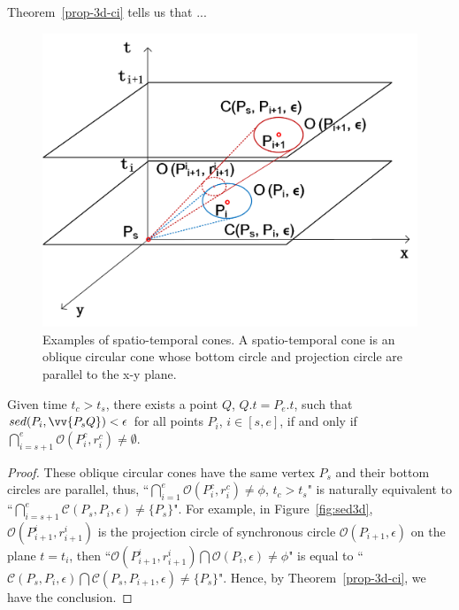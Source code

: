 Theorem~\ref{prop-3d-ci} tells us that ...


\begin{figure}[tb!]
\centering
\includegraphics[scale=0.6]{figures/Fig-cis.png}
\caption{\small Examples of spatio-temporal cones. A spatio-temporal cone is an oblique circular cone whose bottom circle and projection circle are parallel to the x-y plane. }
\vspace{-2ex}
\label{fig:cis}
\end{figure}





\begin{prop}
\label{prop-circle-intersection}
Given time $t_c > t_s$, there exists a point $Q$, $Q.t = P_e.t$, such that $sed(P_i, \vv{P_sQ})<\epsilon$ for all points $P_i$, $i \in [s,e]$, if and only if $\bigcap_{i=s+1}^{e}{\mathcal{O}(P^c_i, r^c_i)} \ne \emptyset$.
\end{prop}


\begin{proof}
These oblique circular cones have the same vertex $P_s$ and their bottom circles are parallel, thus,
 ``$\bigcap_{i=1}^{e}{\mathcal{O}(P^c_i, r^c_i)} \ne \phi$, $t_c > t_s$" is naturally equivalent to ``$\bigcap_{i=s+1}^{e}{\mathcal{C}(P_s, P_i, \epsilon)} \ne \{P_s\}$".
For example, in Figure~\ref{fig:sed3d}, $\mathcal{O}(P^i_{i+1}, r^i_{i+1})$ is the projection circle of synchronous circle $\mathcal{O}(P_{i+1}, \epsilon)$ on the plane $t=t_i$, then ``${\mathcal{O}(P^i_{i+1}, r^i_{i+1})} \bigcap{\mathcal{O}(P_i, \epsilon)} \ne \phi$" is equal to ``$\mathcal{C}(P_s, P_i, \epsilon) \bigcap {\mathcal{C}(P_s, P_{i+1}, \epsilon)} \ne \{P_s\}$".
Hence, by Theorem~\ref{prop-3d-ci}, we have the conclusion.
\end{proof}


